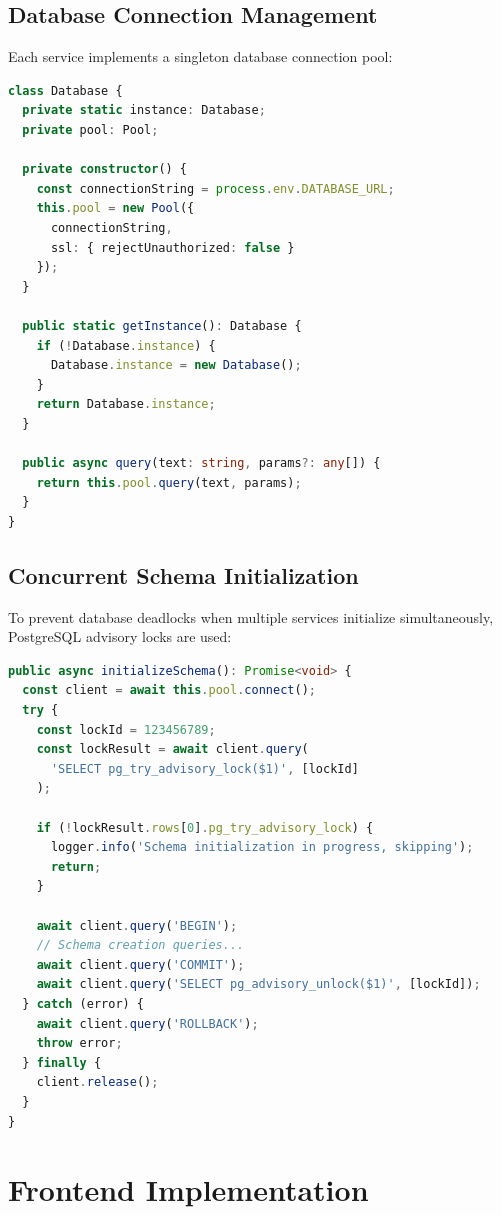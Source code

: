 \documentclass[12pt,a4paper]{article}
\begin{document}
\subsection{Database Connection Management}

Each service implements a singleton database connection pool:

\begin{lstlisting}[language=TypeScript, caption=Database Connection Pool]
class Database {
  private static instance: Database;
  private pool: Pool;

  private constructor() {
    const connectionString = process.env.DATABASE_URL;
    this.pool = new Pool({
      connectionString,
      ssl: { rejectUnauthorized: false }
    });
  }

  public static getInstance(): Database {
    if (!Database.instance) {
      Database.instance = new Database();
    }
    return Database.instance;
  }

  public async query(text: string, params?: any[]) {
    return this.pool.query(text, params);
  }
}
\end{lstlisting}

\subsection{Concurrent Schema Initialization}

To prevent database deadlocks when multiple services initialize simultaneously, PostgreSQL advisory locks are used:

\begin{lstlisting}[language=TypeScript, caption=Advisory Lock Implementation]
public async initializeSchema(): Promise<void> {
  const client = await this.pool.connect();
  try {
    const lockId = 123456789;
    const lockResult = await client.query(
      'SELECT pg_try_advisory_lock($1)', [lockId]
    );
    
    if (!lockResult.rows[0].pg_try_advisory_lock) {
      logger.info('Schema initialization in progress, skipping');
      return;
    }

    await client.query('BEGIN');
    // Schema creation queries...
    await client.query('COMMIT');
    await client.query('SELECT pg_advisory_unlock($1)', [lockId]);
  } catch (error) {
    await client.query('ROLLBACK');
    throw error;
  } finally {
    client.release();
  }
}
\end{lstlisting}

\section{Frontend Implementation}
\end{document}
